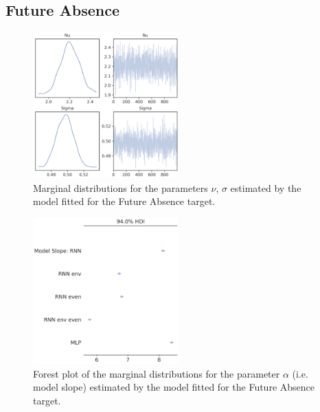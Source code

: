\subsection{Future Absence}
\label{future_abs_bayes_3}

\begin{figure}[ht]
\centering
\includegraphics[width=0.5\textwidth]{images/appendix_C/Future Absence_marginals_3.png}
\caption[\textbf{Future absence marginal distributions}]{Marginal distributions for the parameters $\nu$, $\sigma$ estimated by the model fitted for the Future Absence target.}
\label{marginals_abs_3}
\end{figure} \FloatBarrier

\begin{figure}[ht]
\centering
\includegraphics[width=0.5\textwidth]{images/appendix_C/Future Absence_models_3.png}
\caption[\textbf{Future absence model fixed effect}]{Forest plot of the marginal distributions for the parameter $\alpha$ (i.e. model slope) estimated by the model fitted for the Future Absence target.}
\label{model_abs_3}
\end{figure} \FloatBarrier

